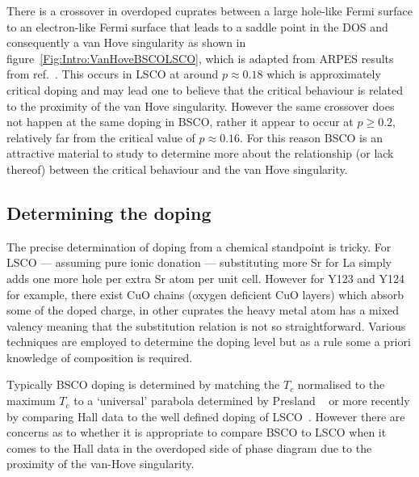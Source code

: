 There is a crossover in overdoped cuprates between a large hole-like Fermi surface to an electron-like Fermi surface that leads to a saddle point in the \ac{DOS} and consequently a van Hove singularity as shown in figure~\ref{Fig:Intro:VanHoveBSCOLSCO}, which is adapted from \ac{ARPES} results from ref.~\cite{Hashimoto2008}. This occurs in \ac{LSCO} at around $p\approx0.18$ which is approximately critical doping and may lead one to believe that the critical behaviour is related to the proximity of the van Hove singularity. However the same crossover does not happen at the same doping in \ac{BSCO}, rather it appear to occur at $p \geq 0.2$, relatively far from the critical value of $p \approx 0.16$. For this reason \ac{BSCO} is an attractive material to study to determine more about the relationship (or lack thereof) between the critical behaviour and the van Hove singularity.


\subsection{Determining the doping}
    \label{Sec:Intro:DeterminingDoping}

The precise determination of doping from a chemical standpoint is tricky. For \ac{LSCO} --- assuming pure ionic donation --- substituting more Sr for La simply adds one more hole per extra Sr atom per unit cell. However for \ac{Y123} and \ac{Y124} for example, there exist CuO chains (oxygen deficient CuO layers) which absorb some of the doped charge, in other cuprates the heavy metal atom has a mixed valency meaning that the substitution relation is not so straightforward. Various techniques are employed to determine the doping level but as a rule some a priori knowledge of composition is required.

Typically \ac{BSCO} doping is determined by matching the $T_c$ normalised to the maximum $T_c$ to a `universal' parabola determined by Presland \etal~\cite{Presland1991} or more recently by comparing Hall data to the well defined doping of \ac{LSCO}~\cite{Ando2000}. However there are concerns as to whether it is appropriate to compare \ac{BSCO} to \ac{LSCO} when it comes to the Hall data in the overdoped side of phase diagram due to the proximity of the van-Hove singularity.


